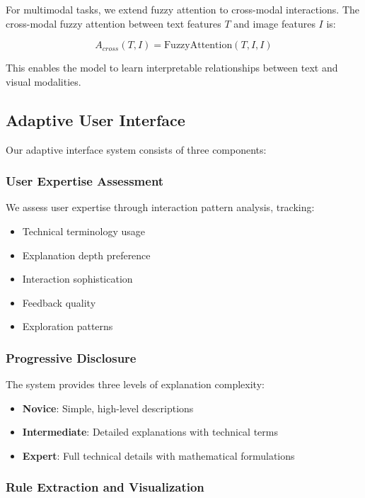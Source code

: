 \documentclass[manuscript,review,anonymous]{acmart}
\begin{document}
For multimodal tasks, we extend fuzzy attention to cross-modal interactions. The cross-modal fuzzy attention between text features $T$ and image features $I$ is:

\begin{equation}
A_{cross}(T, I) = \text{FuzzyAttention}(T, I, I)
\end{equation}

This enables the model to learn interpretable relationships between text and visual modalities.

\subsection{Adaptive User Interface}

Our adaptive interface system consists of three components:

\subsubsection{User Expertise Assessment}

We assess user expertise through interaction pattern analysis, tracking:
\begin{itemize}
    \item Technical terminology usage
    \item Explanation depth preference
    \item Interaction sophistication
    \item Feedback quality
    \item Exploration patterns
\end{itemize}

\subsubsection{Progressive Disclosure}

The system provides three levels of explanation complexity:
\begin{itemize}
    \item \textbf{Novice}: Simple, high-level descriptions
    \item \textbf{Intermediate}: Detailed explanations with technical terms
    \item \textbf{Expert}: Full technical details with mathematical formulations
\end{itemize}

\subsubsection{Rule Extraction and Visualization}
\end{document}
